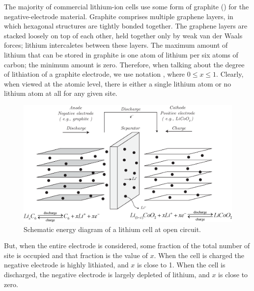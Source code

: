 \documentclass[11pt,a4paper,oneside]{book}
\numberwithin{equation}{section}
\theoremstyle{it}
\theoremstyle{definition}
\begin{document}
The majority of commercial lithium-ion cells use some form of graphite () for the negative-electrode material. Graphite comprises multiple graphene layers, in which hexagonal  structures are tightly bonded together. The graphene layers are stacked loosely on top of each other, held together only by weak van der Waals forces; lithium intercaletes between these layers. The maximum amount of lithium that can be stored in graphite is one atom of lithium per six atoms of carbon; the minimum amount is zero. Therefore, when talking about the degree of lithiation of a graphite electrode, we use notation , where $0\le x\le 1$. Clearly, when viewed at the atomic level, there is either a single lithium atom or no lithium atom at all for any given  site.
\begin{figure}[H]
	\centering
	\includegraphics[width = 420pt, angle = 0, keepaspectratio]{figures/lithium_ion_battery/lithium_ion_battery_3.eps}
	\captionsetup{width=0.5\textwidth, font=small}		
	\caption{Schematic energy diagram of a lithium cell at open circuit.}
	\label{litium_battery_1}
\end{figure}
But, when the entire electrode is considered, some fraction of the total number of  site is occupied and that fraction is the value of $x$. When the cell is charged the negative electrode is highly lithiated, and $x$ is close to 1. When the cell is discharged, the negative electrode is largely depleted of lithium, and $x$ is close to zero.
\end{document}
